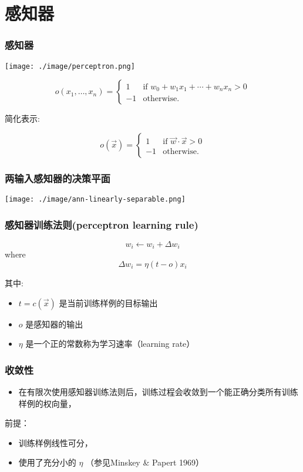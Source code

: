 \documentclass{beamer}
\begin{document}
\section{感知器}
\label{sec-2}
\begin{frame}
\frametitle{感知器}
\label{sec-2-1}

\texttt{[image: ./image/perceptron.png]}

\[o(x_{1}, \ldots, x_{n}) = \left\{ \begin{array}{rl}
     1 & \mbox{if $w_{0} + w_{1}x_1 + \cdots + w_n x_n > 0$}\\
     -1 & \mbox{otherwise.}  
\end{array}
\right. \]

 简化表示:

\[
o(\vec{x}) = \left\{ \begin{array}{rl}
     1 & \mbox{if $\vec{w} \cdot \vec{x} > 0$}\\
     -1 & \mbox{otherwise.}  
\end{array}
\right. 
\]
\end{frame}
\begin{frame}
\frametitle{两输入感知器的决策平面}
\label{sec-2-2}


\texttt{[image: ./image/ann-linearly-separable.png]}
\end{frame}
\begin{frame}
\frametitle{感知器训练法则(perceptron learning rule)}
\label{sec-2-3}


\[w_i \leftarrow w_i + \Delta w_i \]
where
\[ \Delta w_{i} = \eta (t - o) x_{i} \]

其中:

\begin{itemize}
\item $t=c(\vec{x})$ 是当前训练样例的目标输出
\item $o$ 是感知器的输出
\item $\eta$ 是一个正的常数称为学习速率（learning rate）
\end{itemize}
\end{frame}
\begin{frame}
\frametitle{收敛性}
\label{sec-2-4}


\begin{itemize}
\item 在有限次使用感知器训练法则后，训练过程会收敛到一个能正确分类所有训练样例的权向量，
\end{itemize}

前提：

\begin{itemize}
\item 训练样例线性可分，
\item 使用了充分小的 $\eta$ （参见Minskey \& Papert 1969）
\end{itemize}
\end{frame}
\end{document}
